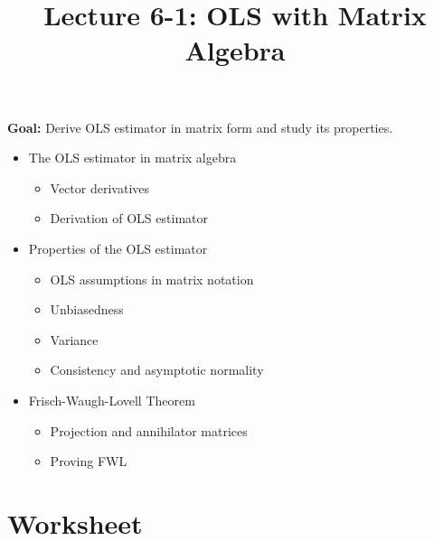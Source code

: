 \documentclass[12pt]{article}
\title{\Large Lecture 6-1: OLS with Matrix Algebra}
\author{}
\date{}
\begin{document}
\maketitle
\vspace{-6em}

\noindent \textbf{Goal:} Derive OLS estimator in matrix form and study its properties.\medskip

\begin{itemize}\setlength{\itemsep}{1em}
\item The OLS estimator in matrix algebra
\begin{itemize}
\item Vector derivatives
\item Derivation of OLS estimator
\end{itemize}
\item Properties of the OLS estimator
\begin{itemize}
\item OLS assumptions in matrix notation
\item Unbiasedness
\item Variance
\item Consistency and asymptotic normality
\end{itemize}
\item Frisch-Waugh-Lovell Theorem
\begin{itemize}
\item Projection and annihilator matrices
\item Proving FWL
\end{itemize}

\end{itemize}


\clearpage


\section*{Worksheet}
\end{document}
